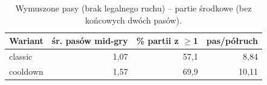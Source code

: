 \begin{table}[H]
\centering
\small
\begin{tabular}{lrrr}
\toprule
Wariant & śr. pasów mid-gry & \% partii z $\geq$1 & pas/półruch \\
\midrule
classic & 1,07 & 57,1 & 8,84 \\
cooldown & 1,57 & 69,9 & 10,11 \\
\bottomrule
\end{tabular}
\caption{Wymuszone pasy (brak legalnego ruchu) -- partie środkowe (bez końcowych dwóch pasów).}
\label{tab:forced_pass}
\end{table}
